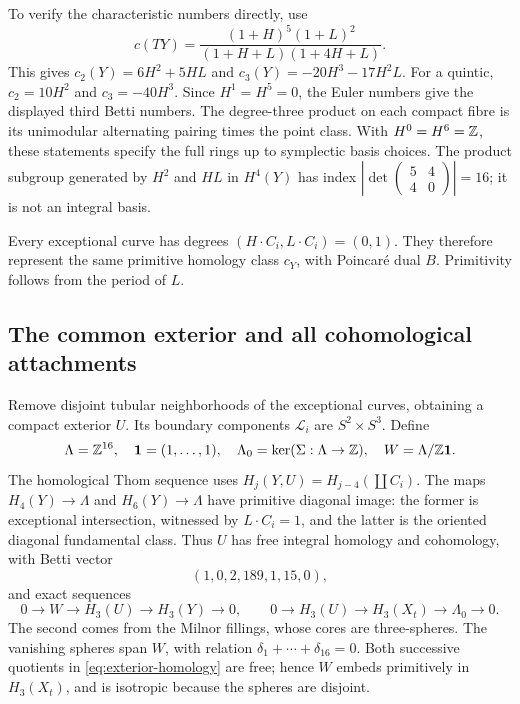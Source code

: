 To verify the characteristic numbers directly, use
\[
 c(TY)=\frac{(1+H)^5(1+L)^2}{(1+H+L)(1+4H+L)}.
\]
This gives $c_2(Y)=6H^2+5HL$ and
$c_3(Y)=-20H^3-17H^2L$. For a quintic,
$c_2=10H^2$ and $c_3=-40H^3$. Since $H^1=H^5=0$, the Euler
numbers give the displayed third Betti numbers. The degree-three product
on each compact fibre is its unimodular alternating pairing times the
point class. With $H^0=H^6=\mathbb Z$, these statements specify the full rings
up to symplectic basis choices. The product subgroup generated by
$H^2$ and $HL$ in $H^4(Y)$ has index
$|\det\left(\begin{smallmatrix}5&4\\4&0\end{smallmatrix}\right)|=16$;
it is not an integral basis.

Every exceptional curve has degrees $(H\cdot C_i,L\cdot C_i)=(0,1)$.
They therefore represent the same primitive homology class $c_Y$, with
Poincar\'e dual $B$. Primitivity follows from the period of $L$.

\subsection{The common exterior and all cohomological attachments}
Remove disjoint tubular neighborhoods of the exceptional curves, obtaining
a compact exterior $U$. Its boundary components $\mathcal L_i$ are
$S^2\times S^3$. Define
\[
 \Lambda=\mathbb Z^{16},\quad \mathbf1=(1,\ldots,1),\quad
 \Lambda_0=\ker(\Sigma:\Lambda\to\mathbb Z),\quad W=\Lambda/\mathbb Z\mathbf1.
\]
The homological Thom sequence uses
$H_j(Y,U)=H_{j-4}(\coprod C_i)$.
The maps $H_4(Y)\to\Lambda$ and $H_6(Y)\to\Lambda$ have primitive
diagonal image: the former is exceptional intersection, witnessed by
$L\cdot C_i=1$, and the latter is the oriented diagonal fundamental
class. Thus $U$ has free integral homology and cohomology, with Betti
vector
\begin{equation}\label{eq:exterior-betti}
 (1,0,2,189,1,15,0),
\end{equation}
and exact sequences
\begin{equation}\label{eq:exterior-homology}
 0\to W\to H_3(U)\to H_3(Y)\to0,
 \qquad 0\to H_3(U)\to H_3(X_t)\to \Lambda_0\to0.
\end{equation}
The second comes from the Milnor fillings, whose cores are three-spheres.
The vanishing spheres span $W$, with relation
$\delta_1+\cdots+\delta_{16}=0$. Both successive quotients in
\eqref{eq:exterior-homology} are free; hence $W$ embeds primitively in
$H_3(X_t)$, and is isotropic because the spheres are disjoint.

